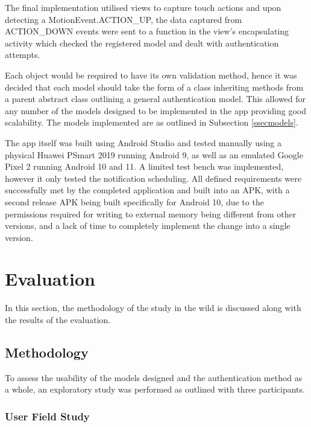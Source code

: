 \documentclass{l4proj}
\begin{document}
The final implementation utilised views to capture touch actions and upon detecting a MotionEvent.ACTION\_UP, the data captured from ACTION\_DOWN events were sent to a function in the view's encapsulating activity which checked the registered model and dealt with authentication attempts.

Each object would be required to have its own validation method, hence it was decided that each model should take the form of a class inheriting methods from a parent abstract class outlining a general authentication model. This allowed for any number of the models designed to be implemented in the app providing good scalability. The models implemented are as outlined in Subsection \ref{ssecmodels}.

The app itself was built using Android Studio and tested manually using a physical Huawei PSmart 2019 running Android 9, as well as an emulated Google Pixel 2 running Android 10 and 11. A limited test bench was implemented, however it only tested the notification scheduling. All defined requirements were successfully met by the completed application and built into an APK, with a second release APK being built specifically for Android 10, due to the permissions required for writing to external memory being different from other versions, and a lack of time to completely implement the change into a single version.



\chapter{Evaluation}

In this section, the methodology of the study in the wild is discussed along with the results of the evaluation.

\section{Methodology}

To assess the usability of the models designed and the authentication method as a whole, an exploratory study was performed as outlined with three participants.

\subsection{User Field Study}
\end{document}
